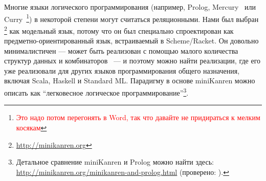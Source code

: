 Многие языки логического программирования (например, Prolog, Mercury~\cite{MercuryFirstPaper} или Curry~\cite{CurryFirstPaper}\footnote{\textcolor{red}{Это надо потом перегонять в Word, так что давайте не придираться к мелким косякам}}) в некоторой степени могут считаться реляционными.
Нами был выбран \miniKanren\footnote{\url{http://minikanren.org}} как модельный язык, потому что он был специально спроектирован как предметно-ориенти\-рованный язык, встраиваемый в Scheme/Racket.
Он довольно минималистичен --- может быть реализован с помощью малого количества структур данных и комбинаторов~\cite{MicroKanren, MuKanrenNew} --- и поэтому можно найти реализации, где его уже реализовали для других языков программирования общего назначения, включая Scala, Haskell и Standard ML.
Парадигму в основе miniKanren можно описать как \enquote{легковесное логическое программирование}\footnote{Детальное сравнение miniKanren и Prolog можно найти здесь: \url{http://minikanren.org/minikanren-and-prolog.html} (проверено: ).}.

